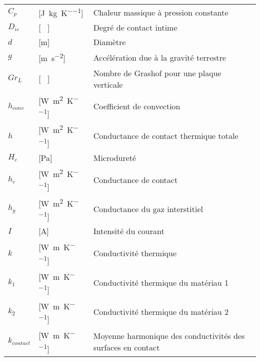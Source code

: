 \begin{longtable}{l p{2.5cm} p{4in}}
	$C_p$            & [\si{\joule\per\kilogram\per\kelvin}]               & Chaleur massique à pression constante                        \\
	$D_{ic}$         & [ \ ]                                               & Degré de contact intime                                      \\
	$d$              & [\si{\metre}]                                       & Diamètre                                                     \\
	$g$              & [\si{\metre\per\square\second}]                     & Accélération due à la gravité terrestre                      \\
	$Gr_L$           & [ \ ]                                               & Nombre de Grashof pour une plaque verticale                  \\
	$h_{conv}$       & [\si{\watt\per\square\metre\per\kelvin}]            & Coefficient de convection                                    \\
	$h$              & [\si{\watt\per\square\metre\per\kelvin}]            & Conductance de contact thermique totale                      \\
	$H_c$            & [\si{\pascal}]                                      & Microdureté                                                  \\
	$h_c$            & [\si{\watt\per\square\metre\per\kelvin}]            & Conductance de contact                                       \\
	$h_g$            & [\si{\watt\per\square\metre\per\kelvin}]            & Conductance du gaz interstitiel                              \\
	$I$              & [\si{\ampere}]                                      & Intensité du courant                                         \\
	$k$              & [\si{\watt\per\metre\per\kelvin}]                   & Conductivité thermique                                       \\
	$k_1$            & [\si{\watt\per\metre\per\kelvin}]                   & Conductivité thermique du matériau 1                         \\
	$k_2$            & [\si{\watt\per\metre\per\kelvin}]                   & Conductivité thermique du matériau 2                         \\
	$k_{contact}$    & [\si{\watt\per\metre\per\kelvin}]                   & Moyenne harmonique des conductivités des surfaces en contact \\

\end{longtable}
